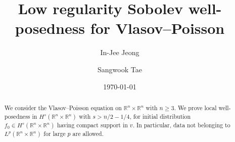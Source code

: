 \documentclass[11pt]{amsart}
\theoremstyle{definition}
\theoremstyle{remark}
\numberwithin{equation}{section}
\newcommand{\0}{\emptyset}
\begin{document}
 
	
	
	
	\title{Low regularity Sobolev well-posedness for Vlasov--Poisson}
	
	
	
	\author{In-Jee Jeong}
	\address{School of Mathematics, Korea Institute for Advanced Study, 85 Hoegi-ro, Seoul 02455, Republic of Korea.}
	
	\author{Sangwook Tae}
	\address{Department of Mathematical Sciences and RIM, Seoul National University, 1 Gwanak-ro, Gwanak-gu, Seoul 08826,  Republic of Korea.}
	
	
	\date{\today}
	
	
	\renewcommand{\thefootnote}{\fnsymbol{footnote}}
	\renewcommand{\thefootnote}{\arabic{footnote}}
	
	
	\maketitle
	
	\begin{abstract}
		We consider the Vlasov--Poisson equation on $\mathbb{R}^n \times \mathbb{R}^n$ with $n \ge 3$. We prove local well-posedness in $H^{s}(\mathbb{R}^n \times \mathbb{R}^n)$ with $s> n/2-1/4$, for initial distribution $f_{0} \in H^{s}(\mathbb{R}^n \times \mathbb{R}^n)$ having compact support in $v$. In particular, data not belonging to $L^p(\mathbb{R}^n \times \mathbb{R}^n)$ for large $p$ are allowed. 
	\end{abstract}
	
\end{document}
